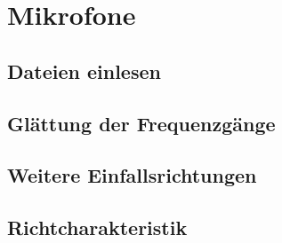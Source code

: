 \section{Mikrofone}
\label{sec:1}

\subsection{Dateien einlesen}

\subsection{Glättung der Frequenzgänge}

\subsection{Weitere Einfallsrichtungen}

\subsection{Richtcharakteristik}